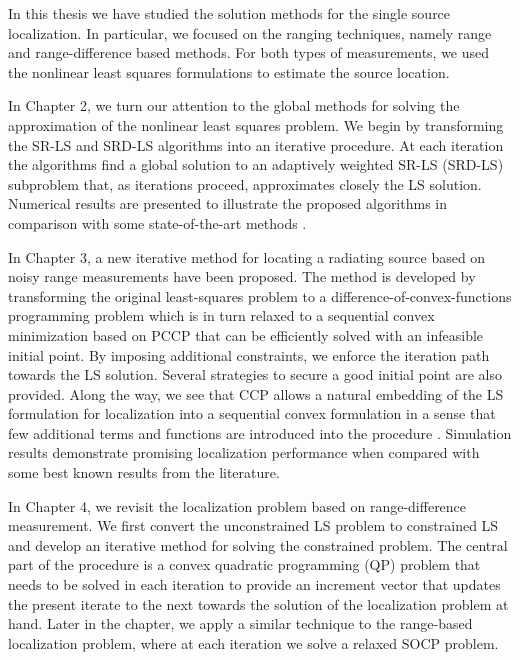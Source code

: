 
In this thesis we have studied the solution methods for the single source localization. In particular, we focused on the ranging techniques, namely range and range-difference based methods. For both types of measurements, we used the nonlinear least squares formulations to estimate the source location. 

In Chapter 2, we turn our attention to the global methods for solving the approximation of the nonlinear least squares problem. We begin by
transforming the SR-LS and SRD-LS algorithms \cite{BeckStLi} into an
iterative procedure. At each iteration the algorithms find a global solution to an  adaptively weighted SR-LS (SRD-LS) subproblem that, as iterations proceed, approximates closely the LS solution.  Numerical results are presented to illustrate the proposed algorithms in comparison with some state-of-the-art methods \cite{IRWSg}.


In Chapter 3,  a new iterative method for locating a radiating source based on noisy range measurements have been proposed. The method is developed by transforming the original least-squares problem to a difference-of-convex-functions programming problem which is in turn relaxed to a sequential convex minimization based on PCCP that can be efficiently solved with an infeasible initial point. By imposing additional constraints, we  enforce the iteration path towards the LS solution. Several strategies to secure a good initial point are also provided.  Along the way, we see that CCP allows a natural embedding of the LS formulation for localization into a sequential convex formulation in a sense that few additional terms and functions are introduced into the procedure \cite{PCCP}. Simulation results demonstrate promising localization performance when compared with some best known results from the literature.

In Chapter 4, we revisit the localization problem based on range-difference measurement. We first convert the unconstrained LS problem to constrained LS and develop an iterative method for solving the constrained problem.  The central part of the procedure is a convex quadratic programming (QP) problem that needs to be solved in each iteration to provide an increment vector that updates the present iterate to the next towards the solution of the localization problem at hand. Later in the chapter, we apply a similar technique to the range-based localization problem, where at each iteration we solve a relaxed SOCP problem.

